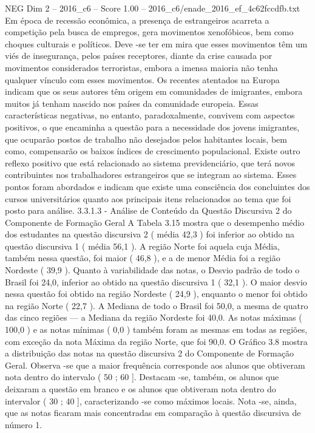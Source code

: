 \begin{textsample}{NEG Dim 2 – 2016\_c6 – Score 1.00 – 2016\_c6/enade\_2016\_ef\_4c62fccdfb.txt}
Em época de recessão econômica, a presença de estrangeiros acarreta a competição pela busca de empregos, gera movimentos xenofóbicos, bem como choques culturais e políticos.
Deve -se ter em mira que esses movimentos têm um viés de insegurança, pelos países receptores, diante da crise causada por movimentos considerados terroristas, embora a imensa maioria não tenha qualquer vínculo com esses movimentos.
Os recentes atentados na Europa indicam que os seus autores têm origem em comunidades de imigrantes, embora muitos já tenham nascido nos países da comunidade europeia.
Essas características negativas, no entanto, paradoxalmente, convivem com aspectos positivos, o que encaminha a questão para a necessidade dos jovens imigrantes, que ocuparão postos de trabalho não desejados pelos habitantes locais, bem como, compensarão os baixos índices de crescimento populacional.
Existe outro reflexo positivo que está relacionado ao sistema previdenciário, que terá novos contribuintes nos trabalhadores estrangeiros que se integram ao sistema.
Esses pontos foram abordados e indicam que existe uma consciência dos concluintes dos cursos universitários quanto aos principais itens relacionados ao tema que foi posto para análise. 3.3.1.3 - Análise de Conteúdo da Questão Discursiva 2 do Componente de Formação Geral A Tabela 3.15 mostra que o desempenho médio dos estudantes na questão discursiva 2 ( média 42,3 ) foi inferior ao obtido na questão discursiva 1 ( média 56,1 ).
A região Norte foi aquela cuja Média, também nessa questão, foi maior ( 46,8 ), e a de menor Média foi a região Nordeste ( 39,9 ).
Quanto à variabilidade das notas, o Desvio padrão de todo o Brasil foi 24,0, inferior ao obtido na questão discursiva 1 ( 32,1 ).
O maior desvio nessa questão foi obtido na região Nordeste ( 24,9 ), enquanto o menor foi obtido na região Norte ( 22,7 ).
A Mediana de todo o Brasil foi 50,0, a mesma de quatro das cinco regiões — a Mediana da região Nordeste foi 40,0.
As notas máximas ( 100,0 ) e as notas mínimas ( 0,0 ) também foram as mesmas em todas as regiões, com exceção da nota Máxima da região Norte, que foi 90,0.
O Gráfico 3.8 mostra a distribuição das notas na questão discursiva 2 do Componente de Formação Geral.
Observa -se que a maior frequência corresponde aos alunos que obtiveram nota dentro do intervalo ( 50 ; 60 ].
Destacam -se, também, os alunos que deixaram a questão em branco e os alunos que obtiveram nota dentro do intervalor ( 30 ; 40 ], caracterizando -se como máximos locais.
Nota -se, ainda, que as notas ficaram mais concentradas em comparação à questão discursiva de número 1.

\end{textsample}
